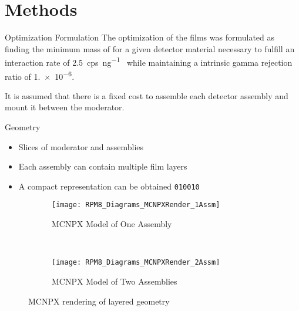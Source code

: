 \section{Methods}
\label{sec:Methodes}
\begin{frame}{Optimization Formulation}
The optimization of the films was formulated as finding the minimum mass of  for a given detector material necessary to fulfill an interaction rate of \SI{2.5}{cps\per\nano\gram{}} while maintaining a intrinsic gamma rejection ratio of \num{1.e-6}.

It is assumed that there is a fixed cost to assemble each detector assembly and mount it between the moderator.
\end{frame}

\begin{frame}[fragile]{Geometry}
\begin{itemize}
	\item Slices of moderator and assemblies
	\item Each assembly can contain multiple film layers
	\item A compact representation can be obtained \verb+010010+
\end{itemize}
\begin{figure}
    \centering
    \begin{subfigure}[b]{0.45\textwidth}
        \texttt{[image: RPM8\_Diagrams\_MCNPXRender\_1Assm]}
        \caption{MCNPX Model of One Assembly}
    \end{subfigure}%
    ~
    \begin{subfigure}[b]{0.45\textwidth}
        \texttt{[image: RPM8\_Diagrams\_MCNPXRender\_2Assm]}
        \caption{MCNPX Model of Two Assemblies}
    \end{subfigure}
    \caption{MCNPX rendering of layered geometry}
    \label{fig:MCNPXRendering}
\end{figure}
\end{frame}

